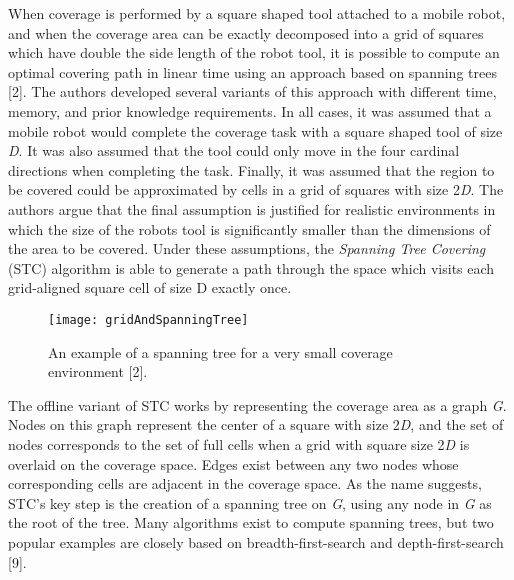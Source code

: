 When coverage is performed by a square shaped tool attached to a mobile robot, and when the coverage area can be exactly decomposed into a grid of squares which have double the side length of the robot tool, it is possible to compute an optimal covering path in linear time using an approach based on spanning trees [2]. The authors developed several variants of this approach with different time, memory, and prior knowledge requirements. In all cases, it was assumed that a mobile robot would complete the coverage task with a square shaped tool of size \textit{D}. It was also assumed that the tool could only move in the four cardinal directions when completing the task. Finally, it was assumed that the region to be covered could be approximated by cells in a grid of squares with size 2\textit{D}. The authors argue that the final assumption is justified for realistic environments in which the size of the robots tool is significantly smaller than the dimensions of the area to be covered. Under these assumptions, the \textit{Spanning Tree Covering} (STC) algorithm is able to generate a path through the space which visits each grid-aligned square cell of size D exactly once.

\begin{figure}[H]
\texttt{[image: gridAndSpanningTree]}
\caption[Spanning Tree Example]{An example of a spanning tree for a very small coverage environment [2].}
\end{figure}

The offline variant of STC works by representing the coverage area as a graph \textit{G}. Nodes on this graph represent the center of a square with size 2\textit{D}, and the set of nodes corresponds to the set of full cells when a grid with square size 2\textit{D} is overlaid on the coverage space. Edges exist between any two nodes whose corresponding cells are adjacent in the coverage space. As the name suggests, STC's key step is the creation of a spanning tree on \textit{G}, using any node in \textit{G} as the root of the tree. Many algorithms exist to compute spanning trees, but two popular examples are closely based on breadth-first-search and depth-first-search [9].

